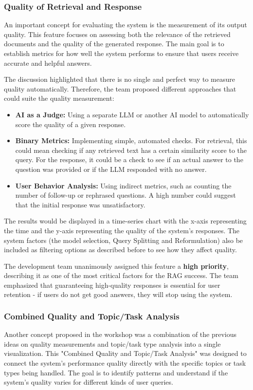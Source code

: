 \documentclass[
	english,
	ruledheaders=section,%
	class=report,%
	thesis={type=bachelor},%
	accentcolor=1b,%
	custommargins=true,%
	marginpar=false,%
	parskip=half-,%
	fontsize=11pt,%
	DIV=14,
]{tudapub}
\begin{document}
\subsubsection{Quality of Retrieval and Response}
An important concept for evaluating the system is the measurement of its output quality. This feature focuses on assessing both the relevance of the retrieved documents and the quality of the generated response. The main goal is to establish metrics for how well the system performs to ensure that users receive accurate and helpful answers.

The discussion highlighted that there is no single and perfect way to measure quality automatically. Therefore, the team proposed different approaches that could suite the quality measurement:

\begin{itemize}
    \item \textbf{AI as a Judge:} Using a separate LLM or another AI model to automatically score the quality of a given response.
    \item \textbf{Binary Metrics:} Implementing simple, automated checks. For retrieval, this could mean checking if any retrieved text has a certain similarity score to the query. For the response, it could be a check to see if an actual answer to the question was provided or if the LLM responded with no answer.
    \item \textbf{User Behavior Analysis:} Using indirect metrics, such as counting the number of follow-up or rephrased questions. A high number could suggest that the initial response was unsatisfactory.
\end{itemize}

The results would be displayed in a time-series chart with the x-axis representing the time and the y-axis representing the quality of the system's responses. The system factors (the model selection, Query Splitting and Reformulation) also be included as filtering options as described before to see how they affect quality.

The development team unanimously assigned this feature a \textbf{high priority}, describing it as one of the most critical factors for the RAG success. The team emphasized that guaranteeing high-quality responses is essential for user retention - if users do not get good answers, they will stop using the system.
\subsubsection{Combined Quality and Topic/Task Analysis}
Another concept proposed in the workshop was a combination of the previous ideas on quality measurements and topic/task type analysis into a single visualization. This "Combined Quality and Topic/Task Analysis" was designed to connect the system's performance quality directly with the specific topics or task types being handled. The goal is to identify patterns and understand if the system's quality varies for different kinds of user queries.
\end{document}
